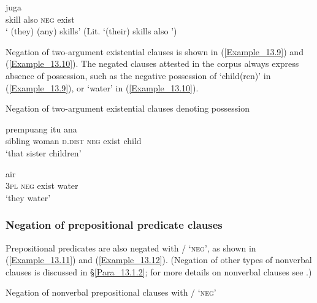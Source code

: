 \ea
\label{Example_13.8}
 {juga} {} {}\\ %
 skill  also  \textsc{neg}  exist\\
 ‘  (they)  (any) skills’ (Lit. ‘(their) skills also ’) \textstyleExampleSource{[081010-001-Cv.0145]}
\z


Negation of two-argument existential clauses is shown in (\ref{Example_13.9}) and (\ref{Example_13.10}). The negated clauses attested in the corpus always express absence of possession, such as the negative possession of  ‘child(ren)’ in (\ref{Example_13.9}), or  ‘water’ in (\ref{Example_13.10}).


\begin{styleExampleTitle}
Negation of two-argument existential clauses denoting possession
\end{styleExampleTitle}

\ea
\label{Example_13.9}
 {prempuang} {itu} {} {} {ana}\\ %
 sibling  woman  \textsc{d.dist}  \textsc{neg}  exist  child\\
\glt 
‘that sister  children’ \textstyleExampleSource{[081006-024-CvEx.0005]}
\z

\ea
\label{Example_13.10}
 {} {} {air}\\ %
 \textsc{3pl}  \textsc{neg}  exist  water\\
\glt
‘they  water’ \textstyleExampleSource{[080919-008-CvNP.0013]}
\z

\subsubsection[Negation of prepositional predicate clauses]{Negation of prepositional predicate clauses}
\label{Para_13.1.1.3}
Prepositional predicates are also negated with / ‘\textsc{neg}’, as shown in (\ref{Example_13.11}) and (\ref{Example_13.12}). (Negation of other types of nonverbal clauses is discussed in §\ref{Para_13.1.2}; for more details on nonverbal clauses see .)


\begin{styleExampleTitle}
Negation of nonverbal prepositional clauses with / ‘\textsc{neg}’
\end{styleExampleTitle}

